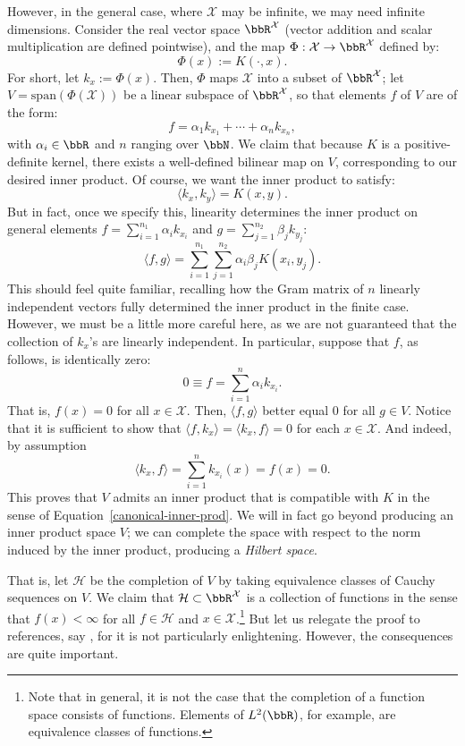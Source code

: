 \documentclass[twoside,11pt]{homework}
\begin{document}
\begin{multicols}{2}
However, in the general case, where $\mathcal{X}$ may be infinite, we may need infinite dimensions. Consider the real vector space $\bbR^\mathcal{X}$ (vector addition and scalar multiplication are defined pointwise), and the map $\Phi: \mathcal{X} \to \bbR^\mathcal{X}$ defined by:
\[\Phi(x) :=K(\cdot, x).\]
For short, let $k_x := \Phi(x)$. Then, $\Phi$ maps $\mathcal{X}$ into a subset of $\bbR^\mathcal{X}$; let $V = \mathrm{span}(\Phi(\mathcal{X}))$ be a linear subspace of $\bbR^\mathcal{X}$, so that elements $f$ of $V$ are of the form:
\[f= \alpha_1k_{x_1} + \dotsm + \alpha_n k_{x_n},\]
with $\alpha_i \in \bbR$ and $n$ ranging over $\bbN$. We claim that because $K$ is a positive-definite kernel, there exists a well-defined bilinear map on $V$, corresponding to our desired inner product. Of course, we want the inner product to satisfy:
\[\langle k_x, k_y\rangle = K(x,y).\]
But in fact, once we specify this, linearity determines the inner product on general elements $f = \sum_{i=1}^{n_1} \alpha_i k_{x_i}$ and $g = \sum_{j=1}^{n_2} \beta_j k_{y_j}$:
\[\langle f, g \rangle = \sum_{i=1}^{n_1} \sum_{j=1}^{n_2} \alpha_i \beta_j K(x_i, y_j).\]
This should feel quite familiar, recalling how the Gram matrix of $n$ linearly independent vectors fully determined the inner product in the finite case. However, we must be a little more careful here, as we are not guaranteed that the collection of $k_x$'s are linearly independent. In particular, suppose that $f$, as follows, is identically zero:
\[0 \equiv f = \sum_{i=1}^n \alpha_i k_{x_i}.\]
That is, $f(x) = 0$ for all $x \in \mathcal{X}$. Then, $\langle f, g\rangle$ better equal 0 for all $g \in V$. Notice that it is sufficient to show that $\langle f, k_x\rangle = \langle k_x , f\rangle = 0$ for each $x \in \mathcal{X}$. And indeed, by assumption
\[\langle k_x, f\rangle = \sum_{i=1}^n k_{x_i}(x) = f(x) = 0.\]
This proves that $V$ admits an inner product that is compatible with $K$ in the sense of Equation~\ref{canonical-inner-prod}. We will in fact go beyond producing an inner product space $V$; we can complete the space with respect to the norm induced by the inner product, producing a \emph{Hilbert space}.

That is, let $\mathcal{H}$ be the completion of $V$ by taking equivalence classes of Cauchy sequences on $V$. We claim that $\mathcal{H} \subset \bbR^\mathcal{X}$ is a collection of functions in the sense that $f(x) < \infty$ for all $f \in \mathcal{H}$ and $x \in \mathcal{X}$.\footnote{Note that in general, it is not the case that the completion of a function space consists of functions. Elements of $L^2(\bbR)$, for example, are equivalence classes of functions.} But let us relegate the proof to references, say \cite[Thm 3.16]{P2009}, for it is not particularly enlightening. However, the consequences are quite important.


\end{multicols}
\end{document}
